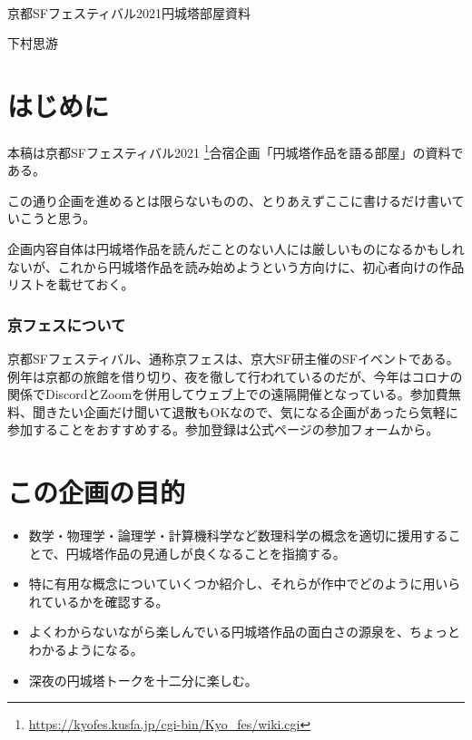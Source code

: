 \documentclass[10pt, a5paper, twoside]{jsarticle}
\begin{document}
	{\Large 　} %

	\begin{center}

		\Large{京都SFフェスティバル2021円城塔部屋資料}

		\vspace{3mm}
		
		\large{下村思游}

	\end{center}

	\vspace{3mm}

	\section{はじめに}

		本稿は京都SFフェスティバル2021 \footnote{ \url{https://kyofes.kusfa.jp/cgi-bin/Kyo_fes/wiki.cgi} }合宿企画「円城塔作品を語る部屋」の資料である。

		この通り企画を進めるとは限らないものの、とりあえずここに書けるだけ書いていこうと思う。

		企画内容自体は円城塔作品を読んだことのない人には厳しいものになるかもしれないが、これから円城塔作品を読み始めようという方向けに、初心者向けの作品リストを載せておく。

		\subsubsection*{京フェスについて}

			京都SFフェスティバル、通称京フェスは、京大SF研主催のSFイベントである。例年は京都の旅館を借り切り、夜を徹して行われているのだが、今年はコロナの関係でDiscordとZoomを併用してウェブ上での遠隔開催となっている。参加費無料、聞きたい企画だけ聞いて退散もOKなので、気になる企画があったら気軽に参加することをおすすめする。参加登録は公式ページの参加フォームから。

	\section{この企画の目的}

		\begin{itemize}

			\item 数学・物理学・論理学・計算機科学など数理科学の概念を適切に援用することで、円城塔作品の見通しが良くなることを指摘する。

			\item 特に有用な概念についていくつか紹介し、それらが作中でどのように用いられているかを確認する。

			\item よくわからないながら楽しんでいる円城塔作品の面白さの源泉を、ちょっとわかるようになる。

			\item 深夜の円城塔トークを十二分に楽しむ。

		\end{itemize}
\end{document}
